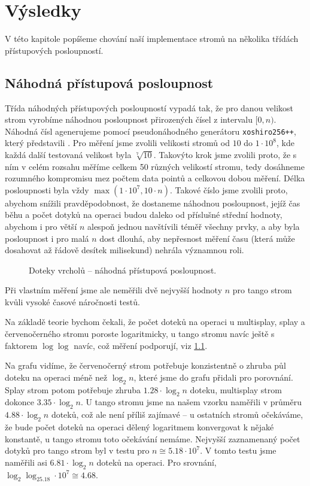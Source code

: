 \chapter{Výsledky}

V této kapitole popíšeme chování naší implementace stromů na několika třídách přístupových posloupností.

\section{Náhodná přístupová posloupnost}

Třída náhodných přístupových posloupností vypadá tak, že pro danou velikost
strom vyrobíme náhodnou posloupnost přirozených čísel z intervalu $[0,n)$.
Náhodná čísl agenerujeme pomocí pseudonáhodného generátoru {\tt xoshiro256++},
který představili \citet{xoshiro}. Pro měření jsme zvolili velikosti stromů od $10$ do $1\cdot
10^8$, kde každá další testovaná velikost byla $\sqrt[7]{10}$. Takovýto krok
jsme zvolili proto, že s ním v celém rozsahu měříme celkem 50 různých velikostí
stromu, tedy dosáhneme rozumného kompromisu mez počtem data pointů a celkovou
dobou měření. Délka posloupnosti byla vždy $\max(1\cdot10^7, 10\cdot n)$.
Takové číslo jsme zvolili proto, abychom snížili pravděpodobnost, že dostaneme
náhodnou posloupnost, jejíž čas běhu a počet dotyků na operaci budou daleko od
příslušné střední hodnoty, abychom i pro větší $n$ alespoň jednou navštívili
téměř všechny prvky, a aby byla posloupnost i pro malá $n$ dost dlouhá, aby
nepřesnost měření času (která může dosahovat až řádově desítek milisekund)
nehrála významnou roli. 

\def\graphfigure#1#2{
\begin{figure}[h!]
\centering
\caption{#2}
\label{obr:#1}
\end{figure}
}

\graphfigure{touch_r}{Doteky vrcholů -- náhodná přístupová posloupnost.}


Při vlastním měření jsme ale neměřili dvě nejvyšší hodnoty $n$ pro tango strom kvůli vysoké časové náročnosti testů.

Na základě teorie bychom čekali, že počet doteků na operaci u multisplay, splay a červenočerného stromu poroste logaritmicky, u tango stromu navíc ještě s faktorem $\log\log$ navíc, což měření podporují, viz \ref{obr:touch_r}.
\let\oldlog\log
\def\log{\oldlog_2}

Na grafu vidíme, že červenočerný strom potřebuje konzistentně o zhruba
půl doteku na operaci méně než $\log n$, které jsme do grafu přidali pro
porovnání. Splay strom potom potřebuje zhruba $1.28\cdot \log n$ doteku,
multisplay strom dokonce $3.35\cdot \log n$. U tango stromu jsme na našem vzorku naměřili v průměru $4.88\cdot \log n$ doteků, což ale není příliš zajímavé -- u ostatních stromů očekáváme, že bude počet doteků na operaci dělený logaritmem konvergovat k nějaké konstantě, u tango stromu toto očekávání nemáme. Nejvyšší zaznamenaný počet dotyků pro tango strom byl v testu pro $n \cong 5.18\cdot 10^7$. V tomto testu jsme naměřili asi $6.81\cdot \log n$ doteků na operaci. Pro srovnání, $\log\log 5.18\cdot 10^7 \cong 4.68$. 

